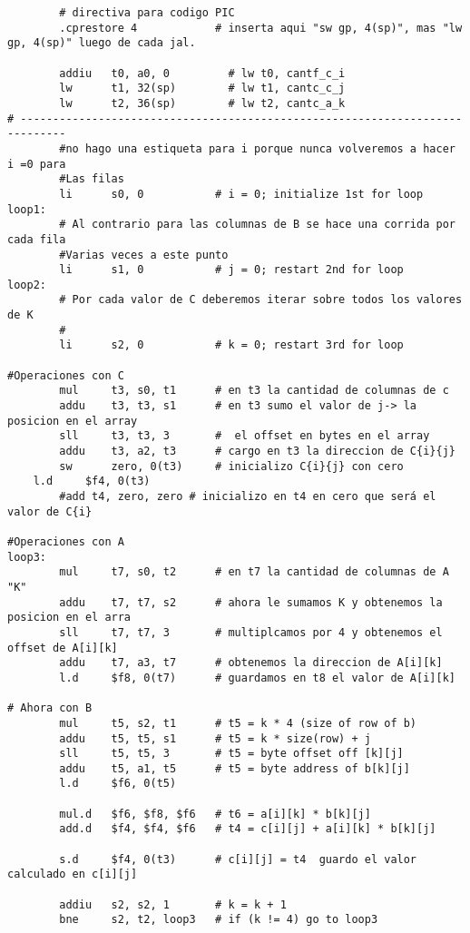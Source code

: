 \documentclass[a4paper,10pt]{article}
\begin{document}
\begin{lstlisting}
        # directiva para codigo PIC
        .cprestore 4            # inserta aqui "sw gp, 4(sp)", mas "lw gp, 4(sp)" luego de cada jal.

        addiu   t0, a0, 0         # lw t0, cantf_c_i
        lw      t1, 32(sp)        # lw t1, cantc_c_j
        lw      t2, 36(sp)        # lw t2, cantc_a_k
# -----------------------------------------------------------------------------
        #no hago una estiqueta para i porque nunca volveremos a hacer i =0 para
        #Las filas
        li      s0, 0           # i = 0; initialize 1st for loop
loop1:
        # Al contrario para las columnas de B se hace una corrida por cada fila
        #Varias veces a este punto
        li      s1, 0           # j = 0; restart 2nd for loop
loop2:
        # Por cada valor de C deberemos iterar sobre todos los valores de K
        #
        li      s2, 0           # k = 0; restart 3rd for loop

#Operaciones con C
        mul     t3, s0, t1      # en t3 la cantidad de columnas de c
        addu    t3, t3, s1      # en t3 sumo el valor de j-> la posicion en el array
        sll     t3, t3, 3       #  el offset en bytes en el array
        addu    t3, a2, t3      # cargo en t3 la direccion de C{i}{j}
        sw      zero, 0(t3)     # inicializo C{i}{j} con cero
	l.d     $f4, 0(t3)
        #add t4, zero, zero # inicializo en t4 en cero que será el valor de C{i}
		
#Operaciones con A
loop3:
        mul     t7, s0, t2      # en t7 la cantidad de columnas de A "K"
        addu    t7, t7, s2      # ahora le sumamos K y obtenemos la posicion en el arra
        sll     t7, t7, 3       # multiplcamos por 4 y obtenemos el offset de A[i][k]
        addu    t7, a3, t7      # obtenemos la direccion de A[i][k]
        l.d     $f8, 0(t7)      # guardamos en t8 el valor de A[i][k]
        
# Ahora con B
        mul     t5, s2, t1      # t5 = k * 4 (size of row of b)
        addu    t5, t5, s1      # t5 = k * size(row) + j
        sll     t5, t5, 3       # t5 = byte offset off [k][j]
        addu    t5, a1, t5      # t5 = byte address of b[k][j]
        l.d     $f6, 0(t5)

        mul.d   $f6, $f8, $f6   # t6 = a[i][k] * b[k][j]
        add.d   $f4, $f4, $f6   # t4 = c[i][j] + a[i][k] * b[k][j]

        s.d     $f4, 0(t3)      # c[i][j] = t4  guardo el valor calculado en c[i][j]

        addiu   s2, s2, 1       # k = k + 1
        bne     s2, t2, loop3   # if (k != 4) go to loop3


\end{lstlisting}
\end{document}
